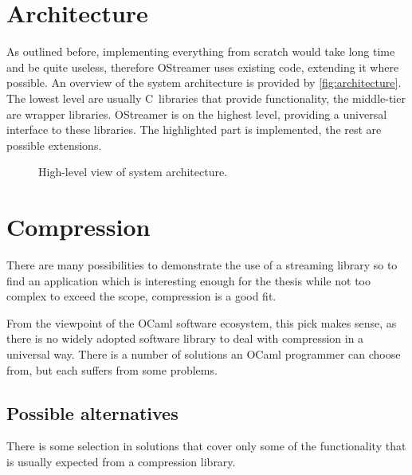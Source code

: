 \documentclass[parskip=half]{scrreprt}
\begin{document}
\section{Architecture}
\label{sec:architecture}

As outlined before, implementing everything from scratch would take long time
and be quite useless, therefore OStreamer uses existing code, extending it
where possible. An overview of the system architecture is provided by
\autoref{fig:architecture}. The lowest level are usually C~libraries that
provide functionality, the middle-tier are wrapper libraries. OStreamer is on
the highest level, providing a universal interface to these libraries. The
highlighted part is implemented, the rest are possible extensions.

\begin{figure}[h]
  \centering
  
  \caption{High-level view of system architecture.}
  \label{fig:architecture}
\end{figure}

\section{Compression}
\label{sec:compression}

There are many possibilities to demonstrate the use of a streaming library so
to find an application which is interesting enough for the thesis while not too
complex to exceed the scope, compression is a good fit.

From the viewpoint of the OCaml software ecosystem, this pick makes sense, as
there is no widely adopted software library to deal with compression in a
universal way. There is a number of solutions an OCaml programmer can choose
from, but each suffers from some problems.

\subsection{Possible alternatives}
\label{sec:alternatives}

There is some selection in solutions that cover only some of the functionality
that is usually expected from a compression library.
\end{document}
